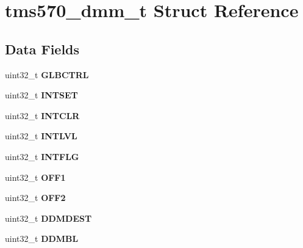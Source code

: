 \hypertarget{structtms570__dmm__t}{}\section{tms570\+\_\+dmm\+\_\+t Struct Reference}
\label{structtms570__dmm__t}
\subsection*{Data Fields}
\begin{DoxyCompactItemize}
\item 
\mbox{\label{structtms570__dmm__t_a56e3c3482aab9011d407dc2ee398097f}} 
uint32\+\_\+t {\bfseries G\+L\+B\+C\+T\+RL}
\item 
\mbox{\label{structtms570__dmm__t_a42068f2415fbeef513bfc166b2f65737}} 
uint32\+\_\+t {\bfseries I\+N\+T\+S\+ET}
\item 
\mbox{\label{structtms570__dmm__t_ab7c291a72a5d6e0cedfdceba081b0b50}} 
uint32\+\_\+t {\bfseries I\+N\+T\+C\+LR}
\item 
\mbox{\label{structtms570__dmm__t_a942abf3ebc79d85d1fe97d98248158c2}} 
uint32\+\_\+t {\bfseries I\+N\+T\+L\+VL}
\item 
\mbox{\label{structtms570__dmm__t_acc418389e56b252b514dfcf6fe0f6c1a}} 
uint32\+\_\+t {\bfseries I\+N\+T\+F\+LG}
\item 
\mbox{\label{structtms570__dmm__t_a781263182974ff79c443a9ae6a3fe492}} 
uint32\+\_\+t {\bfseries O\+F\+F1}
\item 
\mbox{\label{structtms570__dmm__t_a0711b95d729e6358193101e0efaf39f3}} 
uint32\+\_\+t {\bfseries O\+F\+F2}
\item 
\mbox{\label{structtms570__dmm__t_a289b10d9e7670a0c5e5c3d84126531b2}} 
uint32\+\_\+t {\bfseries D\+D\+M\+D\+E\+ST}
\item 
\mbox{\label{structtms570__dmm__t_a4d41eff624c72dc2cf554caa5b93145b}} 
uint32\+\_\+t {\bfseries D\+D\+M\+BL}

\end{DoxyCompactItemize}
